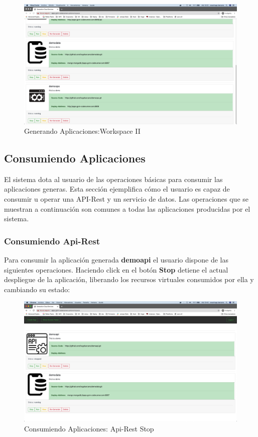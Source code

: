 \documentclass[a4paper,11pt]{book}
\begin{document}
\begin{figure}[H]
\centering
\includegraphics[scale=0.2]{imagenes/casouso/1_2.png}
\caption{   Generando Aplicaciones:Workspace II }
\end{figure}

\subsection{Consumiendo Aplicaciones}

El sistema dota al usuario de las operaciones básicas para consumir las aplicaciones generas. Esta sección ejemplifica cómo el usuario es capaz de consumir u operar una API-Rest y un servicio de datos. Las operaciones que se muestran a continuación son comunes a todas las aplicaciones producidas por el sistema. 

\subsubsection{Consumiendo Api-Rest}
Para consumir la aplicación generada \textbf{demoapi} el usuario dispone de las siguientes operaciones. Haciendo click en el botón \textbf{Stop} detiene el actual despliegue de la aplicación, liberando los recursos virtuales consumidos por ella y cambiando su estado:

\begin{figure}[H]
\centering
\includegraphics[scale=0.2]{imagenes/casouso/1_3.png}
\caption{  Consumiendo Aplicaciones: Api-Rest  Stop}
\end{figure}
\end{document}
